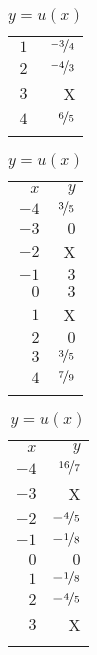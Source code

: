\begin{exercises}
\begin{problem}
\begin{table}[!htb]
\begin{widepage}
\begin{subtable}{.2\textwidth}
\begin{tabular}{rr}
				 $1$  & $\nicefrac{-3}{4}$  \\\normalline
				 $2$  & $\nicefrac{-4}{3}$  \\\normalline
				 $3$  & X                   \\\normalline
				 $4$  & $\nicefrac{6}{5}$   \\\lastline
			 \end{tabular}
		 \end{subtable}
		 \hfill
		 \begin{subtable}{.2\textwidth}
			 \centering
			 \caption{$y=t(x)$}
			 \label{rat:tab:findformulat}
			 \begin{tabular}{rr}
				 \beforeheading
				 $x$  & $y$               \\ \afterheading
				 $-4$ & $\nicefrac{3}{5}$ \\\normalline
				 $-3$ & $0$               \\\normalline
				 $-2$ & X                 \\\normalline
				 $-1$ & $3$               \\\normalline
				 $0$  & $3$               \\\normalline
				 $1$  & X                 \\\normalline
				 $2$  & $0$               \\\normalline
				 $3$  & $\nicefrac{3}{5}$ \\\normalline
				 $4$  & $\nicefrac{7}{9}$ \\\lastline
			 \end{tabular}
		 \end{subtable}
		 \hfill
		 \begin{subtable}{.2\textwidth}
			 \centering
			 \caption{$y=u(x)$}
			 \label{rat:tab:findformulau}
			 \begin{tabular}{rr}
				 \beforeheading
				 $x$  & $y$                \\ \afterheading
				 $-4$ & $\nicefrac{16}{7}$ \\\normalline
				 $-3$ & X                  \\\normalline
				 $-2$ & $-\nicefrac{4}{5}$ \\\normalline
				 $-1$ & $-\nicefrac{1}{8}$ \\\normalline
				 $0$  & $0$                \\\normalline
				 $1$  & $-\nicefrac{1}{8}$ \\\normalline
				 $2$  & $-\nicefrac{4}{5}$ \\\normalline
				 $3$  & X                  \\\normalline

\end{tabular}
\end{subtable}
\end{widepage}
\end{table}
\end{problem}
\end{exercises}
